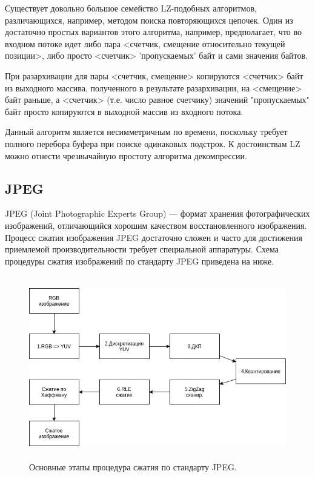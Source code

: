 Существует довольно большое семейство LZ-подобных алгоритмов,
различающихся, например, методом поиска повторяющихся цепочек. Один из
достаточно простых вариантов этого алгоритма, например, предполагает, что во
входном потоке идет либо пара <счетчик, смещение относительно текущей
позиции>, либо просто <счетчик> 'пропускаемых' байт и сами значения
байтов.

При разархивации для пары <счетчик, смещение> копируются <счетчик>
байт из выходного массива, полученного в результате разархивации, на
<смещение> байт раньше, а <счетчик> (т.е. число равное счетчику) значений
"пропускаемых" байт просто копируются в выходной массив из входного
потока.

Данный алгоритм является несимметричным по времени, поскольку
требует полного перебора буфера при поиске одинаковых подстрок.
К достоинствам LZ можно отнести чрезвычайную простоту алгоритма
декомпрессии.
    
    
    
    \subsection{JPEG}
    
    JPEG (Joint Photographic Experts Group) --- формат хранения фотографических изображений, отличающийся хорошим качеством восстановленного изображения. Процесс сжатия изображения JPEG достаточно сложен и часто для достижения приемлемой производительности требует специальной аппаратуры. Схема процедуры сжатия изображений по стандарту JPEG приведена на ниже. \cite{JPEG1}
    
     \begin{figure}[h!]
    	\centering
    	\includegraphics[width=\textwidth,height=8cm,keepaspectratio]{jpegdi.png}
    	\caption{Основные этапы процедура сжатия по стандарту JPEG.} \label{fig:jpegdi}
    \end{figure}
    
